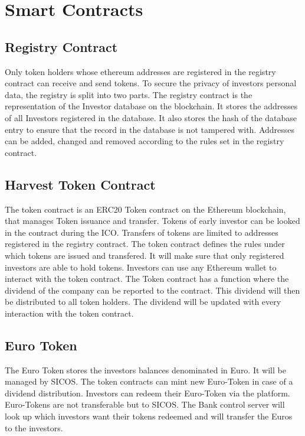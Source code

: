 \documentclass[11pt]{article}
\begin{document}
\section{Smart Contracts}


\subsection{Registry Contract}

Only token holders whose ethereum addresses are registered in the registry contract can receive and send tokens. To secure the privacy of investors personal data, the registry is split into two parts. 
The registry contract is the representation of the Investor database on the blockchain. It stores the addresses of all Investors registered in the database. It also stores the hash of the database entry to ensure that the record in the database is not tampered with. Addresses can be added, changed and removed according to the rules set in the registry contract. 

\subsection{Harvest Token Contract}
The token contract is an ERC20 Token contract on the Ethereum blockchain, that manages Token issuance and transfer. Tokens of early investor can be looked in the contract during the ICO. Transfers of tokens are limited to addresses registered in the registry contract. The token contract defines the rules under which tokens are issued and transfered. It will make sure that only registered investors are able to hold tokens. 
Investors can use any Ethereum wallet to interact with the token contract.
The Token contract has a function where the dividend of the company can be reported to the contract. This dividend will then be distributed to all token holders. The dividend will be updated with every interaction with the token contract. 

\subsection{Euro Token}
The Euro Token stores the investors balances denominated in Euro. It will be managed by SICOS. The token contracts can mint new Euro-Token in case of a dividend distribution. Investors can redeem their Euro-Token via the platform. Euro-Tokens are not transferable but to SICOS. 
The Bank control server will look up which investors want their tokens redeemed and will transfer the Euros to the investors.
 
\end{document}
